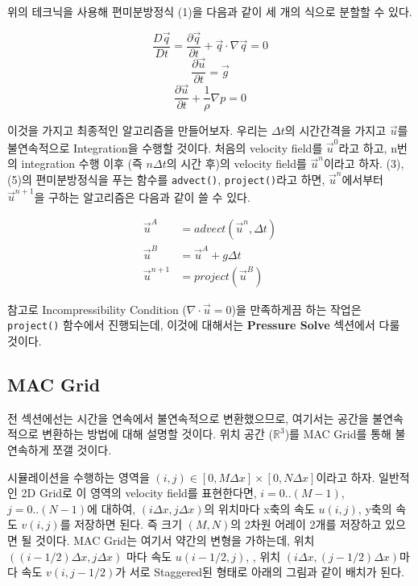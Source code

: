 \documentclass[10pt, A4]{article}
\begin{document}
위의 테크닉을 사용해 편미분방정식 (1)을 다음과 같이 세 개의 식으로 분할할 수 있다.

\begin{equation}
  \frac{D\vec{q}}{Dt} = \frac{\partial \vec{q}}{\partial t} + \vec{q} \cdot \nabla \vec{q} = 0
\end{equation}
\begin{equation}
  \frac{\partial \vec{u}}{\partial t} = \vec{g}
\end{equation}
\begin{equation}
  \frac{\partial \vec{u}}{\partial t} + \frac{1}{\rho} \nabla p = 0
\end{equation}

이것을 가지고 최종적인 알고리즘을 만들어보자.
우리는 $\Delta t$의 시간간격을 가지고 $\vec{u}$를 불연속적으로 Integration을 수행할 것이다. 처음의 velocity field를 $\vec{u}^0$라고 하고, n번의 integration 수행 이후 (즉 $n \Delta t$의 시간 후)의 velocity field를 $\vec{u}^n$이라고 하자. (3), (5)의 편미분방정식을 푸는 함수를 \texttt{advect()}, \texttt{project()}라고 하면, $\vec{u}^n$에서부터 $\vec{u}^{n+1}$을 구하는 알고리즘은 다음과 같이 쓸 수 있다.

\begin{align}
  \vec{u}^A &= advect(\vec{u}^n, \Delta t) \\
  \vec{u}^B &= \vec{u}^A + g \Delta t \\
  \vec{u}^{n+1} &= project(\vec{u}^B)
\end{align}

참고로 Incompressibility Condition ($\nabla \cdot \vec{u} = 0$)을 만족하게끔 하는 작업은 \texttt{project()} 함수에서 진행되는데, 이것에 대해서는 \textbf{Pressure Solve} 섹션에서 다룰 것이다.

\subsection{MAC Grid}

전 섹션에선는 시간을 연속에서 불연속적으로 변환했으므로, 여기서는 공간을 불연속적으로 변환하는 방법에 대해 설명할 것이다. 위치 공간 ($\mathbb{R}^3$)를 MAC Grid를 통해 불연속하게 쪼갤 것이다.

시뮬레이션을 수행하는 영역을 $(i, j) \in [0, M \Delta x] \times [0, N \Delta x]$이라고 하자. 일반적인 2D Grid로 이 영역의 velocity field를 표현한다면, $i = 0..(M-1)$, $j = 0..(N-1)$에 대하여,  $(i \Delta x, j \Delta x)$의 위치마다 x축의 속도 $u(i, j)$, y축의 속도 $v(i, j)$를 저장하면 된다. 즉 크기 $(M, N)$의 2차원 어레이 2개를 저장하고 있으면 될 것이다. MAC Grid는 여기서 약간의 변형을 가하는데, 위치 $((i-1/2) \Delta x, j \Delta x)$ 마다 속도 $u(i-1/2, j)$, , 위치 $(i \Delta x, (j-1/2) \Delta x)$마다 속도 $v(i,j-1/2)$가 서로 Staggered된 형태로 아래의 그림과 같이 배치가 된다.
\end{document}

